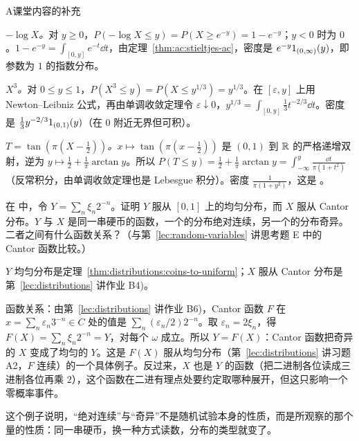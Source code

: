 \begin{exercises}{A}{课堂内容的补充}
\begin{solution}
\emph{$-\log X$。}对 $y\geqslant0$，$P(-\log X\leqslant y)=P(X\geqslant e^{-y})=1-e^{-y}$；$y<0$ 时为 $0$。$1-e^{-y}=\int_{[0,y]}e^{-t}\dd t$，由定理~\ref{thm:ac:stieltjes-ac}，密度是 $e^{-y}1_{(0,\infty)}(y)$，即参数为 $1$ 的指数分布。

\emph{$X^3$。}对 $0\leqslant y\leqslant1$，$P(X^3\leqslant y)=P(X\leqslant y^{1/3})=y^{1/3}$。在 $[\varepsilon,y]$ 上用 Newton--Leibniz 公式，再由单调收敛定理令 $\varepsilon\downarrow0$，$y^{1/3}=\int_{[0,y]}\frac13t^{-2/3}\dd t$。密度是 $\frac13y^{-2/3}1_{(0,1)}(y)$（在 $0$ 附近无界但可积）。

\emph{$T=\tan(\pi(X-\frac12))$。}$x\mapsto\tan(\pi(x-\frac12))$ 是 $(0,1)$ 到 $\mathbb{R}$ 的严格递增双射，逆为 $y\mapsto\frac12+\frac1\pi\arctan y$。所以 $P(T\leqslant y)=\frac12+\frac1\pi\arctan y=\int_{-\infty}^y\frac{\dd t}{\pi(1+t^2)}$（反常积分，由单调收敛定理也是 Lebesgue 积分）。密度 $\frac1{\pi(1+y^2)}$，这是 。
\end{solution}

\item\label{ex:ac:A11} 在 中，令 $Y=\sum_n\xi_n2^{-n}$。证明 $Y$ 服从 $[0,1]$ 上的均匀分布，而 $X$ 服从 Cantor 分布。$Y$ 与 $X$ 是同一串硬币的函数，一个的分布绝对连续，另一个的分布奇异。二者之间有什么函数关系？（与第~\ref{lec:random-variables} 讲思考题 E 中的 Cantor 函数比较。）
\begin{solution}
$Y$ 均匀分布是定理~\ref{thm:distributions:coins-to-uniform}；$X$ 服从 Cantor 分布是第~\ref{lec:distributions} 讲作业 B4)。

函数关系：由第~\ref{lec:distributions} 讲作业 B6)，Cantor 函数 $F$ 在 $x=\sum_n\varepsilon_n3^{-n}\in C$ 处的值是 $\sum_n(\varepsilon_n/2)2^{-n}$。取 $\varepsilon_n=2\xi_n$，得 $F(X)=\sum_n\xi_n2^{-n}=Y$，对每个 $\omega$ 成立。所以 $Y=F(X)$：Cantor 函数把奇异的 $X$ 变成了均匀的 $Y$。这是 $F(X)$ 服从均匀分布（第~\ref{lec:distributions} 讲习题 A2，$F$ 连续）的一个具体例子。反过来，$X$ 也是 $Y$ 的函数（把二进制各位读成三进制各位再乘 $2$），这个函数在二进有理点处要约定取哪种展开，但这只影响一个零概率事件。

这个例子说明，“绝对连续”与“奇异”不是随机试验本身的性质，而是所观察的那个量的性质：同一串硬币，换一种方式读数，分布的类型就变了。
\end{solution}
\end{exercises}

